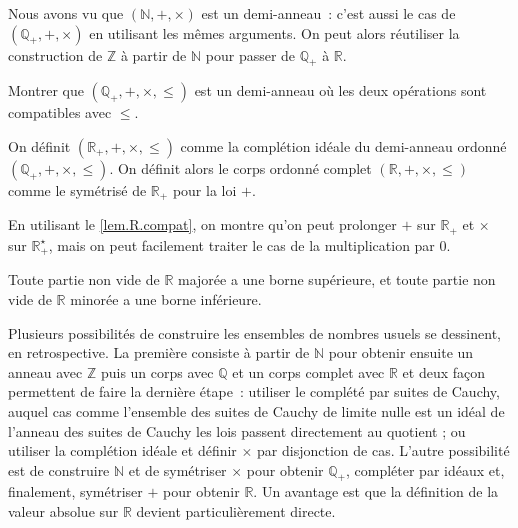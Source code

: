 Nous avons vu que $(\mathbb N,+,\times)$ est un demi-anneau~: c'est aussi le cas
de $(\mathbb Q_+,+,\times)$ en utilisant les mêmes arguments. On peut alors
réutiliser la construction de $\mathbb Z$ à partir de $\mathbb N$ pour passer de
$\mathbb Q_+$ à $\mathbb R$.

\begin{exercise}
  Montrer que $(\mathbb Q_+,+,\times,\leq)$ est un demi-anneau où les deux
  opérations sont compatibles avec $\leq$.
\end{exercise}

\begin{definition}
  On définit $(\mathbb R_+,+,\times,\leq)$ comme la complétion idéale du
  demi-anneau ordonné $(\mathbb Q_+,+,\times,\leq)$. On définit alors le corps
  ordonné complet $(\mathbb R,+,\times,\leq)$ comme le symétrisé de
  $\mathbb R_+$ pour la loi $+$.
\end{definition}

\begin{remark}
  En utilisant le \cref{lem.R.compat}, on montre qu'on peut prolonger $+$ sur
  $\mathbb R_+$ et $\times$ sur $\mathbb R_+^\star$, mais on peut facilement
  traiter le cas de la multiplication par $0$.
\end{remark}

\begin{corollary}
  Toute partie non vide de $\mathbb R$ majorée a une borne supérieure, et toute
  partie non vide de $\mathbb R$ minorée a une borne inférieure.
\end{corollary}

\begin{remark}
  Plusieurs possibilités de construire les ensembles de nombres usuels se
  dessinent, en retrospective. La première consiste à partir de $\mathbb N$
  pour obtenir ensuite un anneau avec $\mathbb Z$ puis un corps avec $\mathbb Q$
  et un corps complet avec $\mathbb R$ et deux façon permettent de faire la
  dernière étape~: utiliser le complété par suites de Cauchy, auquel cas comme
  l'ensemble des suites de Cauchy de limite nulle est un idéal de l'anneau des
  suites de Cauchy les lois passent directement au quotient ; ou utiliser la
  complétion idéale et définir $\times$ par disjonction de cas. L'autre
  possibilité est de construire $\mathbb N$ et de symétriser $\times$ pour
  obtenir $\mathbb Q_+$, compléter par idéaux et, finalement, symétriser
  $+$ pour obtenir $\mathbb R$. Un avantage est que la définition de la valeur
  absolue sur $\mathbb R$ devient particulièrement directe.
\end{remark}
